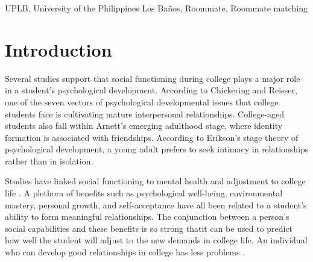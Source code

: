 \documentclass[journal]{./IEEE/IEEEtran}
\title{\SPTITLE}
\author{\ADVISEE~and~\ADVISER%
\REMARK
}
\newcommand{\UPLB}{University of the Philippines Los Ba\~{n}os }
\begin{document}
\maketitle

\begin{abstract}
This article explores the role and significance of roommates in a college student's development - from the initial adaptation with the roommate setting, to their academic performance and life after college. The importance of finding the proper roommates so that a student can maximize their psychological development, get higher grades, and develop open-mindedness is highlighted. A solution is proposed in the form of a web application that can help \UPLB students find mutually beneficial roommates for their college life. This solution also extends itself to solve the dorm-finding problem students experience at the start of every semester.
\end{abstract}

\begin{keywords}
UPLB, University of the Philippines Los Ba\~{n}os, Roommate, Roommate matching
\end{keywords}

\section{Introduction}

Several studies support that social functioning during college plays a major role in a student's psychological development. According to Chickering and Reisser, one of the seven vectors of psychological developmental issues that college students face is cultivating mature interpersonal relationships\cite{chickering}. College-aged students also fall within Arnett's emerging adulthood stage, where identity formation is associated with friendships\cite{erb}. According to Erikson's stage theory of psychological development, a young adult prefers to seek intimacy in relationships rather than in isolation\cite{erikson}.

Studies have linked social functioning to mental health and adjustment to college life \cite{erb}. A plethora of benefits such as psychological well-being, environmental mastery, personal growth, and self-acceptance have all been related to a student's ability to form meaningful relationships\cite{erb}. The conjunction between a person{'}s social capabilities and these benefits is so strong thatit can be used to predict how well the student will adjust to the new demands in college life. An individual who can develop good relationships in college has less problems \cite{erb}.
\end{document}
